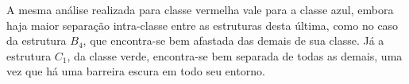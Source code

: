 A mesma análise realizada para classe vermelha vale para a classe azul, embora haja maior separação intra-classe entre as estruturas desta última, como no caso da estrutura $B_4$, que encontra-se bem afastada das demais de sua classe. Já a estrutura $C_1$, da classe verde, encontra-se bem separada de todas as demais, uma vez que há uma barreira escura em todo seu entorno. 

\begin{comment}

The concept of fractal, introduced by Mandelbrot \citep{Mandelbrot:2000}, is closely related to self-similarity or scaling of a shape. Moreover, it encompasses the notion of fractional dimension.  Actually, fractal dimension and \emph{MFD} are well-known methods to estimate shape complexity \citep{Backes:2012}. Shape complexity is an important concept in shape analysis that informs how much space a shape occupies \cite{Costa:2009}. \emph{MFD} estimates shape complexity through a curve that represents changes in the complexity as the shape visualization scale varies \cite{Florindo:2012}. 








\end{comment}
